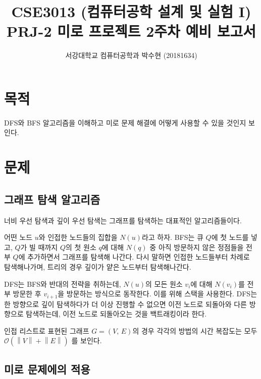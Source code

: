 
\newcommand{\norm}[1]{\left\lVert#1\right\rVert}



\title{CSE3013 (컴퓨터공학 설계 및 실험 I) \space \newline PRJ-2 미로 프로젝트 2주차 예비 보고서}
\author{서강대학교 컴퓨터공학과 박수현 (20181634)}
\maketitle

\section{목적}
DFS와 BFS 알고리즘을 이해하고 미로 문제 해결에 어떻게 사용할 수 있을 것인지 보인다.

\section{문제}
\subsection{그래프 탐색 알고리즘}

너비 우선 탐색과 깊이 우선 탐색는 그래프를
탐색하는 대표적인 알고리즘들이다.

어떤 노드 $u$와 인접한 노드들의 집합을 $N\left(u\right)$라고 하자. BFS는 큐 $Q$에 첫 노드를 넣고,
$Q$가 빌 때까지 $Q$의 첫 원소 $q$에 대해 $N\left(q\right)$ 중 아직 방문하지 않은 정점들을 전부 $Q$에 추가하면서 그래프를 탐색해 나간다.
다시 말하면 인접한 노드들부터 차례로 탐색해나가며, 트리의 경우 깊이가 얕은 노드부터 탐색해나간다.

DFS는 BFS와 반대의 전략을 취하는데, $N\left(u\right)$의 모든 원소 $v_i$에 대해 $N\left(v_i\right)$를 전부 방문한 후 $v_{i + 1}$을
방문하는 방식으로 동작한다. 이를 위해 스택을 사용한다. DFS는 한 방향으로 깊이 탐색하다가 더 이상 진행할 수 없으면 이전 노드로 되돌아와 다른
방향으로 탐색하는데, 이전 노드로 되돌아오는 것을 백트래킹이라 한다.

인접 리스트로 표현된 그래프 $G = \left(V,\,E\right)$의 경우 각각의 방법의 시간 복잡도는 모두 $\mathcal{O}\left(\norm{V}+\norm{E}\right)$
를 보인다.

\subsection{미로 문제에의 적용}

